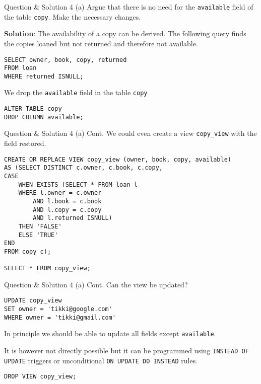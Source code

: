 \begin{frame}[fragile]{Question \& Solution 4 (a)}
Argue that there is no need for the \texttt{available} field of the table \texttt{copy}. Make the necessary changes. \vspace{10pt}

\textbf{Solution}:
The availability of a copy can be derived. \vspace{10pt}
The following query finds the copies loaned but not returned and therefore not available.
\begin{lstlisting}
SELECT owner, book, copy, returned 
FROM loan 
WHERE returned ISNULL;
\end{lstlisting}

We drop the \texttt{available} field in the table \texttt{copy}

\begin{lstlisting}
ALTER TABLE copy
DROP COLUMN available;
\end{lstlisting}

\end{frame}

\begin{frame}[fragile]{Question \& Solution 4 (a) Cont.}
We could even create a view \texttt{copy\_view} with the field restored.

\begin{lstlisting}
CREATE OR REPLACE VIEW copy_view (owner, book, copy, available) 
AS (SELECT DISTINCT c.owner, c.book, c.copy, 
CASE
	WHEN EXISTS (SELECT * FROM loan l  
	WHERE l.owner = c.owner
		AND l.book = c.book
		AND l.copy = c.copy 
		AND l.returned ISNULL) 
	THEN 'FALSE'
	ELSE 'TRUE' 
END
FROM copy c);

SELECT * FROM copy_view;
\end{lstlisting}

\end{frame}

\begin{frame}[fragile]{Question \& Solution 4 (a) Cont.}
Can the view be updated? 

\begin{lstlisting}
UPDATE copy_view 
SET owner = 'tikki@google.com' 
WHERE owner = 'tikki@gmail.com'
\end{lstlisting}

In principle we should be able to update all fields except \texttt{available}.  \vspace{10pt}

It is however not directly possible but it can be programmed using \texttt{INSTEAD OF UPDATE} triggers or  unconditional \texttt{ON UPDATE DO INSTEAD} rules.

\begin{lstlisting}
DROP VIEW copy_view;
\end{lstlisting}
\end{frame}

